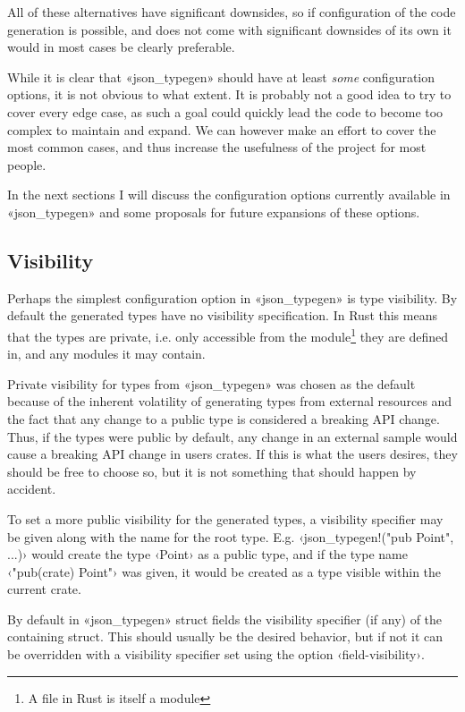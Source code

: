All of these alternatives have significant downsides, so if configuration of the code generation is possible, and does not come with significant downsides of its own it would in most cases be clearly preferable.

While it is clear that «json_typegen» should have at least \emph{some} configuration options, it is not obvious to what extent. It is probably not a good idea to try to cover every edge case, as such a goal could quickly lead the code to become too complex to maintain and expand. We can however make an effort to cover the most common cases, and thus increase the usefulness of the project for most people.

In the next sections I will discuss the configuration options currently available in «json_typegen» and some proposals for future expansions of these options.

\subsection{Visibility}
\label{sec:visibility}

Perhaps the simplest configuration option in «json_typegen» is type visibility. By default the generated types have no visibility specification. In Rust this means that the types are private, i.e. only accessible from the module\footnote{A file in Rust is itself a module} they are defined in, and any modules it may contain.

Private visibility for types from «json_typegen» was chosen as the default because of the inherent volatility of generating types from external resources and the fact that any change to a public type is considered a breaking API change. Thus, if the types were public by default, any change in an external sample would cause a breaking API change in users crates. If this is what the users desires, they should be free to choose so, but it is not something that should happen by accident.

To set a more public visibility for the generated types, a visibility specifier may be given along with the name for the root type. E.g. ‹json_typegen!("pub Point", ...)› would create the type ‹Point› as a public type, and if the type name ‹"pub(crate) Point"› was given, it would be created as a type visible within the current crate.

By default in «json_typegen» struct fields  the visibility specifier (if any) of the containing struct. This should usually be the desired behavior, but if not it can be overridden with a visibility specifier set using the option ‹field-visibility›.

